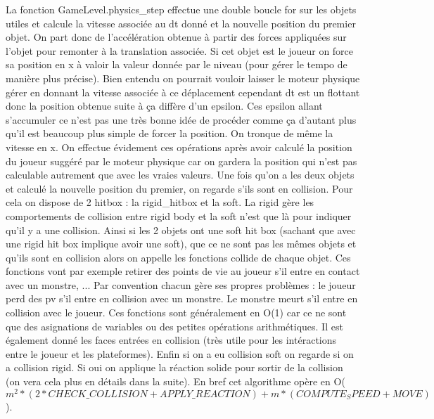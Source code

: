\documentclass[11pt]{article}
\begin{document}
\indent La fonction GameLevel.physics\_step effectue une double boucle for sur les objets utiles et calcule la vitesse associée au dt donné et la nouvelle position du premier objet. On part donc de l'accélération obtenue à partir des forces appliquées sur l'objet pour remonter à la translation associée. Si cet objet est le joueur on force sa position en x à valoir la valeur donnée par le niveau (pour gérer le tempo de manière plus précise). Bien entendu on pourrait vouloir laisser le moteur physique gérer en donnant la vitesse associée à ce déplacement cependant dt est un flottant donc la position obtenue suite à ça diffère d'un epsilon. Ces epsilon allant s'accumuler ce n'est pas une très bonne idée de procéder comme ça d'autant plus qu'il est beaucoup plus simple de forcer la position. On tronque de même la vitesse en x. On effectue évidement ces opérations après avoir calculé la position du joueur suggéré par le moteur physique car on gardera la position qui n'est pas calculable autrement que avec les vraies valeurs. Une fois qu'on a les deux objets et calculé la nouvelle position du premier, on regarde s'ils sont en collision. Pour cela on dispose de 2 hitbox : la rigid\_hitbox et la soft. La rigid gère les comportements de collision entre rigid body et la soft n'est que là pour indiquer qu'il y a une collision. Ainsi si les 2 objets ont une soft hit box (sachant que avec une rigid hit box implique avoir une soft), que ce ne sont pas les mêmes objets et qu'ils sont en collision alors on appelle les fonctions collide de chaque objet. Ces fonctions vont par exemple retirer des points de vie au joueur s'il entre en contact avec un monstre, ... Par convention chacun gère ses propres problèmes : le joueur perd des pv s'il entre en collision avec un monstre. Le monstre meurt s'il entre en collision avec le joueur. Ces fonctions sont généralement en O(1) car ce ne sont que des asignations de variables ou des petites opérations arithmétiques. Il est également donné les faces entrées en collision (très utile pour les intéractions entre le joueur et les plateformes). Enfin si on a eu collision soft on regarde si on a collision rigid. Si oui on applique la réaction solide pour sortir de la collision (on vera cela plus en détails dans la suite). En bref cet algorithme opère en O($m^2*(2*CHECK\_COLLISION+APPLY\_REACTION)+m*(COMPUTE_SPEED+MOVE)$).\\
\end{document}
